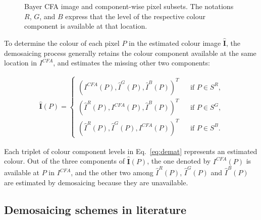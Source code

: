 \documentclass[twoside]{article}
\begin{document}
\begin{figure}[H]
	\caption[Bayer CFA image and component-wise pixel subsets.]{Bayer CFA image and component-wise pixel subsets. The notations $R$, $G$, and $B$ express that the level of the respective colour component is available at that location.}
	\label{fig: Bayer CFA and the component image}
\end{figure}



%


To determine the colour of each pixel $P$ in the estimated colour image $\hat{\textbf{I}}$, the demosaicing process generally retains the colour component available at the same location in $I^{CFA}$, and estimates the missing other two components:

\begin{eqnarray}\hat{\textbf{I}}(P) =
	\left\lbrace
	\begin{array}{ccc}
		\left(I^{CFA}(P),\hat{I}^G(P), \hat{I}^B(P) \right)^T & & \text{if $P \in S^R$,}\\
		\left(\hat{I}^R(P),I^{CFA}(P), \hat{I}^B(P) \right)^T & & \text{if $P \in S^G$,}\\
		\left(\hat{I}^R(P),\hat{I}^G(P), I^{CFA}(P) \right)^T & & \text{if $P \in S^B$.}
	\end{array}\right.
\label{eq:demat}
\end{eqnarray}

\noindent Each triplet of colour component levels in Eq.~\eqref{eq:demat} represents an estimated colour. Out of the three components of $\hat{\textbf{I}}(P)$, the one denoted by $I^{CFA}(P)$ is available at $P$ in $I^{CFA}$, and the other two among $\hat{I}^R(P)$, $\hat{I}^G(P)$ and $\hat{I}^B(P)$ are estimated by demosaicing because they are unavailable.

\subsection{Demosaicing schemes in literature}
\label{subsec:literature}
\end{document}
